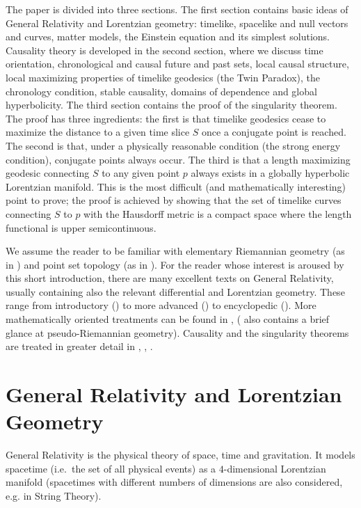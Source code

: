 \documentclass[12pt]{amsart}
\theoremstyle{definition}
\theoremstyle{remark}
\begin{document}
The paper is divided into three sections. The first section contains basic ideas of General Relativity and Lorentzian geometry: timelike, spacelike and null vectors and curves, matter models, the Einstein equation and its simplest solutions. Causality theory is developed in the second section, where we discuss time orientation, chronological and causal future and past sets, local causal structure, local maximizing properties of timelike geodesics (the Twin Paradox), the chronology condition, stable causality, domains of dependence and global hyperbolicity. The third section contains the proof of the singularity theorem. The proof has three ingredients: the first is that timelike geodesics cease to maximize the distance to a given time slice $S$ once a conjugate point is reached. The second is that, under a physically reasonable condition (the strong energy condition), conjugate points always occur. The third is that a length maximizing geodesic connecting $S$ to any given point $p$ always exists in a globally hyperbolic Lorentzian manifold. This is the most difficult (and mathematically interesting) point to prove; the proof is achieved by showing that the set of timelike curves connecting $S$ to $p$ with the Hausdorff metric is a compact space where the length functional is upper semicontinuous.

We assume the reader to be familiar with elementary Riemannian geometry (as in \cite{Carmo93}) and point set topology (as in \cite{Munkres00}). For the reader whose interest is aroused by this short introduction, there are many excellent texts on General Relativity, usually containing also the relevant differential and Lorentzian geometry. These range from introductory (\cite{Schutz02}) to more advanced (\cite{W84}) to encyclopedic (\cite{MTW73}). More mathematically oriented treatments can be found in \cite{BEE96}, \cite{ONeill83} (\cite{GHL04} also contains a brief glance at pseudo-Riemannian geometry). Causality and the singularity theorems are treated in greater detail in \cite{Penrose87}, \cite{HE95}, \cite{Naber88}.
%
%
%
\section{General Relativity and Lorentzian Geometry}
%
General Relativity is the physical theory of space, time and gravitation. It models spacetime (i.e.~the set of all physical events) as a $4$-dimensional Lorentzian manifold (spacetimes with different numbers of dimensions are also considered, e.g. in String Theory).
\end{document}
